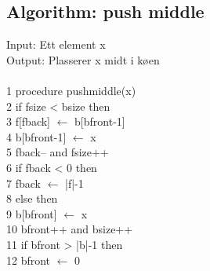 \documentclass{article}%
\newcommand{\æ}{\textunderscore}
\newcommand{\å}{\iosevka}
\begin{document}
    \begin{minipage}[t]{.48\linewidth}
        \subsection*{Algorithm: push middle} 
        {\sbweight Input:} Ett element {\å x}\\
        {\sbweight Output:} Plasserer {\iosevka x} midt i køen\\\\
        \iosevka
        \color{darkgray}
        1 procedure push\textunderscore middle(x) \\
        2\hspace*{6mm} if f\æ size < b\æ size then \\
        3\hspace*{12mm} f[f\æ back] $\leftarrow$ b[b\æ front-1]\\
        4\hspace*{12mm} b[b\æ front-1] $\leftarrow$ x \\
        5\hspace*{12mm} f\æ back-- and f\æ size++\\
        6\hspace*{12mm} if f\æ back < 0 then\\
        7\hspace*{18mm} f\æ back $\leftarrow$ |f|-1\\
        8\hspace*{6mm} else then\\
        9\hspace*{12mm} b[b\æ front] $\leftarrow$ x\\
        10\hspace*{10mm} b\æ front++ and b\æ size++\\
        11\hspace*{10mm} if b\æ front > |b|-1 then\\
        12\hspace*{16mm} b\æ front $\leftarrow$ 0 \\
    \end{minipage}
    \hspace{4mm}
\end{document}
